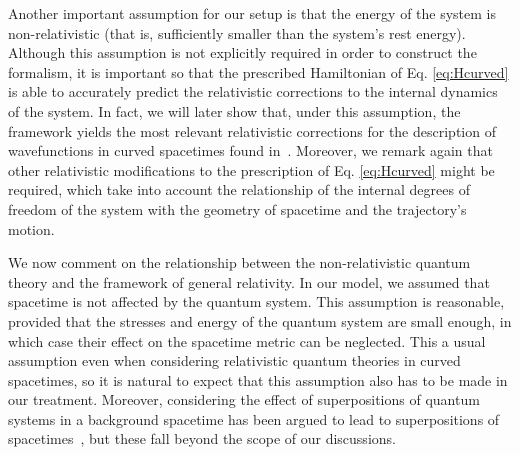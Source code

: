 \documentclass[letterpaper,12pt,titlepage,oneside,final]{book}
\begin{document}
Another important assumption for our setup is that the energy of the system is non-relativistic (that is, sufficiently smaller than the system's rest energy). Although this assumption is not explicitly required in order to construct the formalism, it is important so that the prescribed Hamiltonian of Eq. \eqref{eq:Hcurved} is able to accurately predict the relativistic corrections to the internal dynamics of the system. In fact, we will later show that, under this assumption, the framework yields the most relevant relativistic corrections for the description of wavefunctions in curved spacetimes found in~\cite{jonas}. Moreover, we remark again that other relativistic modifications to the prescription of Eq. \eqref{eq:Hcurved} might be required, which take into account the relationship of the internal degrees of freedom of the system with the geometry of spacetime and the trajectory's motion.

We now comment on the relationship between the non-relativistic quantum theory and the framework of general relativity. In our model, we assumed that spacetime is not affected by the quantum system. This assumption is reasonable, provided that the stresses and energy of the quantum system are small enough, in which case their effect on the spacetime metric can be neglected. This a usual assumption even when considering relativistic quantum theories in curved spacetimes, so it is natural to expect that this assumption also has to be made in our treatment. Moreover, considering the effect of superpositions of quantum systems in a background spacetime has been argued to lead to superpositions of spacetimes~\cite{flaminiaSuperpositionSpacetimes2022}, but these fall beyond the scope of our discussions.
\end{document}
